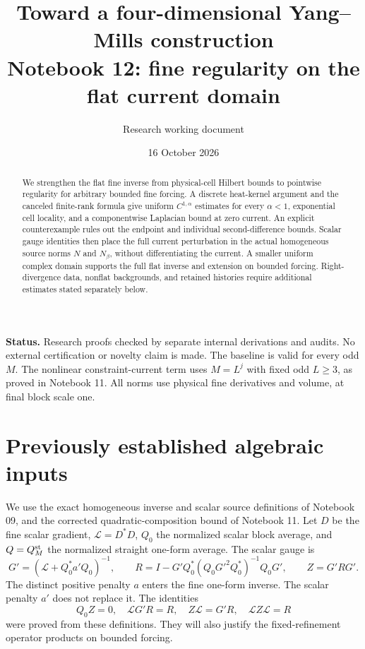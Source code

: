 \documentclass[11pt]{article}
\title{Toward a four-dimensional Yang--Mills construction\\
\large Notebook 12: fine regularity on the flat current domain}
\author{Research working document}
\date{16 October 2026}
\theoremstyle{remark}
\begin{document}
\maketitle
\begin{abstract}
We strengthen the flat fine inverse from physical-cell Hilbert bounds
to pointwise regularity for arbitrary bounded fine forcing. A discrete
heat-kernel argument and the canceled finite-rank formula give uniform
$C^{1,\alpha}$ estimates for every $\alpha<1$, exponential cell locality,
and a componentwise Laplacian bound at zero current. An explicit
counterexample rules out the endpoint and individual second-difference
bounds. Scalar gauge identities then place the full current
perturbation in the actual homogeneous source norms $N$ and $N_\beta$,
without differentiating the current. A smaller uniform complex domain
supports the full flat inverse and extension on bounded forcing.
Right-divergence data, nonflat backgrounds, and retained histories
require additional estimates stated separately below.
\end{abstract}

\noindent\textbf{Status.}
Research proofs checked by separate internal derivations and audits.
No external certification or novelty claim is made. The baseline is
valid for every odd $M$. The nonlinear constraint-current term uses
$M=L^j$ with fixed odd $L\ge3$, as proved in Notebook 11. All norms
use physical fine derivatives and volume, at final block scale one.

\section{Previously established algebraic inputs}

We use the exact homogeneous inverse and scalar source definitions of
Notebook 09, and the corrected quadratic-composition bound of Notebook 11.
Let $D$ be the fine scalar gradient, $\mathcal L=D^*D$, $Q_0$ the
normalized scalar block average, and $Q=Q_M^{\rm st}$ the normalized
straight one-form average. The scalar gauge is
\[
 G'=(\mathcal L+Q_0^*a'Q_0)^{-1},\qquad
 R=I-G'Q_0^*(Q_0G'^2Q_0^*)^{-1}Q_0G',\qquad Z=G'RG'.
\]
The distinct positive penalty $a$ enters the fine one-form inverse.
The scalar penalty $a'$ does not replace it. The identities
\[
 Q_0Z=0,\quad \mathcal L G'R=R,\quad
 Z\mathcal L=G'R,\quad \mathcal L Z\mathcal L=R
\]
were proved from these definitions. They will also justify the
fixed-refinement operator products on bounded forcing.
\end{document}
